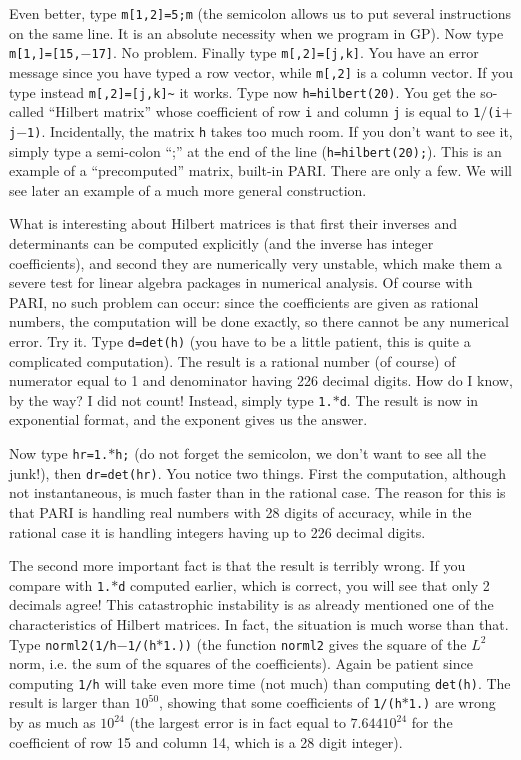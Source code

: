 Even better, type {\tt m[1,2]=5;m} (the semicolon allows us to put several
instructions on the same line. It is an absolute necessity when we program
in GP). Now type {\tt m[1,]=[15,$-$17]}. No problem. Finally type
{\tt m[,2]=[j,k]}. You have an error message since you have typed a row
vector, while {\tt m[,2]} is a column vector. If you type instead
{\tt m[,2]=[j,k]\~{}} it works.
\smallskip
Type now {\tt h=hilbert(20)}. You get the so-called ``Hilbert matrix'' whose 
coefficient of row {\tt i} and column {\tt j} is equal to
{\tt 1$/$(i$+$j$-$1)}. Incidentally, the matrix {\tt h} takes too
much room. If you don't want to see it, simply type a semi-colon ``;'' at the
end of the line ({\tt h=hilbert(20);}). This is an example of a ``precomputed''
matrix, built-in PARI. There are only a few. We will see later an example
of a much more general construction.

What is interesting about Hilbert matrices is that first their inverses and
determinants can be computed explicitly (and the inverse has integer
coefficients), and second they are numerically very unstable, which make
them a severe test for linear algebra packages in numerical analysis.
Of course with PARI, no such problem can occur: since the coefficients are
given as rational numbers, the computation will be done exactly, so there
cannot be any numerical error. Try it. Type {\tt d=det(h)} (you have to be
a little patient, this is quite a complicated computation). The result is
a rational number (of course) of numerator equal to 1 and denominator having
226 decimal digits. How do I know, by the way? I did not count! Instead,
simply type {\tt 1.$*$d}. The result is now in exponential format, and the
exponent gives us the answer.

Now type {\tt hr=1.$*$h;} (do not forget the semicolon, we don't want to see
all the junk!), then {\tt dr=det(hr)}. You notice two things. First the
computation, although not instantaneous, is much faster than in the rational
case. The reason for this is that PARI is handling real numbers with 28 digits
of accuracy, while in the rational case it is handling integers having up to
226 decimal digits.

The second more important fact is that the result is terribly wrong. If you
compare with {\tt 1.$*$d} computed earlier, which is correct, you will see that
only 2 decimals agree! This catastrophic instability is as already 
mentioned one of the characteristics of Hilbert matrices. In fact, the 
situation is much worse than that. Type {\tt norml2(1/h$-$1/(h$*$1.))}
(the function {\tt norml2} gives the square of the $L^2$ norm, i.e. the sum of
the squares of the coefficients). Again be patient since computing {\tt 1/h}
will take even more time (not much) than computing {\tt det(h)}. The result
is larger than $10^{50}$, showing that some coefficients of {\tt 1/(h$*$1.)}
are wrong by as much as $10^{24}$ (the largest error is in fact equal
to $7.644 10^{24}$ for the coefficient of row 15 and column 14, which is a
28 digit integer).

